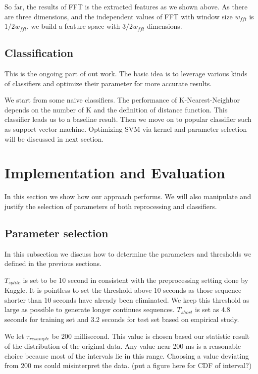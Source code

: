 \documentclass{article} %
\begin{document}
So far, the results of FFT is the extracted features as we shown above. As there are three dimensions, and the independent values of FFT with window size $w_{fft}$ is $1/2w_{fft}$, we build a feature space with $3/2w_{fft}$ dimensions.

\subsection{Classification}
This is the ongoing part of out work. The basic idea is to leverage various kinds of classifiers and optimize their parameter for more accurate results.

We start from some naive classifiers. The performance of K-Nearest-Neighbor depends on the number of K and the definition of distance function. This classifier leads us to a baseline result. Then we move on to popular classifier such as support vector machine. Optimizing SVM via kernel and parameter selection will be discussed in next section.

\section{Implementation and Evaluation}
In this section we show how our approach performs. We will also manipulate and justify the selection of parameters of both reprocessing and classifiers.

\subsection{Parameter selection}
In this subsection we discuss how to determine the parameters and thresholds we defined in the previous sections.

$T_{splite}$ is set to be 10 second in consistent with the preprocessing setting done by Kaggle. It is pointless to set the threshold above 10 seconds as those sequence shorter than 10 seconds have already been eliminated. We keep this threshold as large as possible to generate longer continues sequences. $T_{short}$ is set as 4.8 seconds for training set and 3.2 seconds for test set based on empirical study. 

We let $\tau_{resample}$ be 200 millisecond. This value is chosen based our statistic result of the distribution of the original data. Any value near 200 ms is a reasonable choice because most of the intervals lie in this range. Choosing a value deviating from 200 ms could misinterpret the data. (put a figure here for CDF of interval?)
\end{document}
